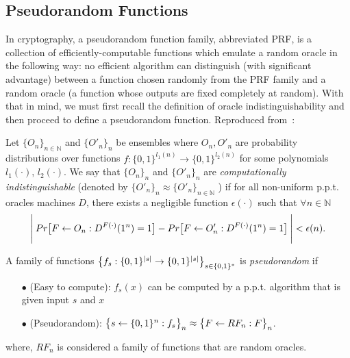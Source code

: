 \subsection{Pseudorandom Functions} \label{sec:PRF}
In cryptography, a pseudorandom function family, abbreviated PRF, is a collection of efficiently-computable functions which emulate a random oracle in the following way: no efficient algorithm can distinguish (with significant advantage) between a function chosen randomly from the PRF family and a random oracle (a function whose outputs are fixed completely at random). With that in mind,
we must first recall the definition of oracle indistinguishability and then proceed to define a pseudorandom function. Reproduced from~\cite{ACI}:

\begin{definition}
  Let $\{ O_n \}_{n \in \mathbb{N}}$ and $\{ O'_{n} \}_{n}$ be ensembles where $O_n, O'_n$ are probability
  distributions over functions $f: \{ 0,1 \}^{l_1(n)} \rightarrow \{ 0,1 \}^{l_2(n)}$ for some polynomials $l_1(\cdot)$, $l_2(\cdot)$. We say that $\{ O_{n} \}_{n}$ and $\{ O'_{n} \}_{n}$ are \emph{computationally indistinguishable} (denoted by $\{ O'_{n} \}_{n} \approx \{ O'_n \}_{n \in \mathbb{N}}$
  ) if for all non-uniform p.p.t. oracles machines $D$, there exists a negligible function $\epsilon(\cdot)$ such that $\forall n \in \mathbb{N}$
  \begin{equation} \label{oracle}
    \Bigg{\lvert} \: Pr \big{[} F \leftarrow O_n : D^{F(\cdot)}(1^n)=1 \big{]} - Pr \big{[} F \leftarrow O'_n : D^{F(\cdot)}(1^n)=1 \big{]} \: \Bigg{\rvert} < \epsilon(n).
  \end{equation}
\end{definition}
\pagebreak

\begin{definition}
  A family of functions $\big{\{} f_s: \{ 0,1 \}^{\lvert s \rvert} \rightarrow \{ 0,1 \}^{\lvert s \rvert} \big{\}}_{s \in \{ 0,1 \}^{*}}$ is \emph{pseudorandom} if
  \begin{itemize}
    \item[$\bullet$] (Easy to compute): $f_s(x)$ can be computed by a p.p.t. algorithm that is given input $s$ and $x$
    \item[$\bullet$] (Pseudorandom): $\big{\{} s \leftarrow \{ 0,1 \}^n: f_s \big{\}}_n \approx \big{\{} F \leftarrow RF_n: F \big{\}}_n$.
  \end{itemize}
\end{definition}
\noindent where, $RF_{n}$ is considered a family of functions that are random oracles.

